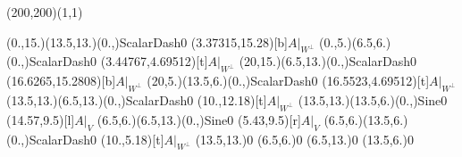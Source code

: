 \unitlength=1bp%

\begin{feynartspicture}(200,200)(1,1)

\FADiagram{}
\FAProp(0.,15.)(13.5,13.)(0.,){ScalarDash}{0}
\FALabel(3.37315,15.28)[b]{$A|_{W^\perp}$}
\FAProp(0.,5.)(6.5,6.)(0.,){ScalarDash}{0}
\FALabel(3.44767,4.69512)[t]{$A|_{W^\perp}$}
\FAProp(20,15.)(6.5,13.)(0.,){ScalarDash}{0}
\FALabel(16.6265,15.2808)[b]{$A|_{W^\perp}$}
\FAProp(20,5.)(13.5,6.)(0.,){ScalarDash}{0}
\FALabel(16.5523,4.69512)[t]{$A|_{W^\perp}$}
\FAProp(13.5,13.)(6.5,13.)(0.,){ScalarDash}{0}
\FALabel(10.,12.18)[t]{$A|_{W^\perp}$}
\FAProp(13.5,13.)(13.5,6.)(0.,){Sine}{0}
\FALabel(14.57,9.5)[l]{$A|_V$}
\FAProp(6.5,6.)(6.5,13.)(0.,){Sine}{0}
\FALabel(5.43,9.5)[r]{$A|_V$}
\FAProp(6.5,6.)(13.5,6.)(0.,){ScalarDash}{0}
\FALabel(10.,5.18)[t]{$A|_{W^\perp}$}
\FAVert(13.5,13.){0}
\FAVert(6.5,6.){0}
\FAVert(6.5,13.){0}
\FAVert(13.5,6.){0}
\end{feynartspicture}


